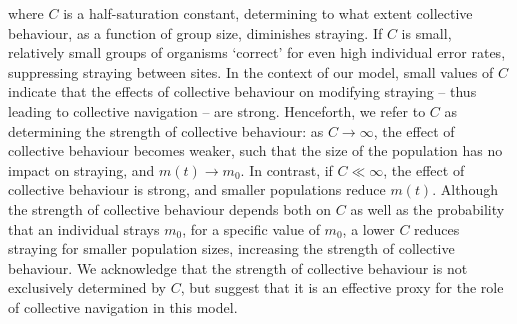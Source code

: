 \documentclass{revtex4}
\begin{document}
\noindent where $C$ is a half-saturation constant, determining to what extent collective behaviour, as a function of group size, diminishes straying.
If $C$ is small, relatively small groups of organisms `correct' for even high individual error rates, suppressing straying between sites.
In the context of our model, small values of $C$ indicate that the effects of collective behaviour on modifying straying -- thus leading to collective navigation -- are strong.
Henceforth, we refer to $C$ as determining the strength of collective behaviour: as $C\rightarrow\infty$, the effect of collective behaviour becomes weaker, such that the size of the population has no impact on straying, and $m(t)\rightarrow m_0$.
In contrast, if $C \ll \infty$, the effect of collective behaviour is strong, and smaller populations reduce $m(t)$.
Although the strength of collective behaviour depends both on $C$ as well as the probability that an individual strays $m_0$, for a specific value of $m_0$, a lower $C$ reduces straying for smaller population sizes, increasing the strength of collective behaviour.
We acknowledge that the strength of collective behaviour is not exclusively determined by $C$, but suggest that it is an effective proxy for the role of collective navigation in this model.
\end{document}
